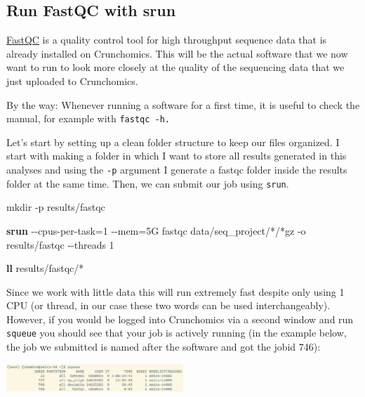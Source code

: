 \documentclass[
  letterpaper,
  DIV=11,
  numbers=noendperiod]{scrreprt}
\newenvironment{Shaded}{}{}
\newcommand{\AttributeTok}[1]{\textcolor[rgb]{0.84,0.23,0.29}{#1}}
\newcommand{\ExtensionTok}[1]{\textcolor[rgb]{0.84,0.23,0.29}{\textbf{#1}}}
\newcommand{\FunctionTok}[1]{\textcolor[rgb]{0.44,0.26,0.76}{#1}}
\newcommand{\NormalTok}[1]{\textcolor[rgb]{0.14,0.16,0.18}{#1}}
\newcommand{\OperatorTok}[1]{\textcolor[rgb]{0.14,0.16,0.18}{#1}}
\newcommand{\PreprocessorTok}[1]{\textcolor[rgb]{0.84,0.23,0.29}{#1}}
\begin{document}
\subsection{Run FastQC with srun}\label{run-fastqc-with-srun}

\href{https://www.bioinformatics.babraham.ac.uk/projects/fastqc/}{FastQC}
is a quality control tool for high throughput sequence data that is
already installed on Crunchomics. This will be the actual software that
we now want to run to look more closely at the quality of the sequencing
data that we just uploaded to Crunchomics.

By the way: Whenever running a software for a first time, it is useful
to check the manual, for example with \texttt{fastqc\ -h.}

Let's start by setting up a clean folder structure to keep our files
organized. I start with making a folder in which I want to store all
results generated in this analyses and using the \texttt{-p} argument I
generate a fastqc folder inside the results folder at the same time.
Then, we can submit our job using \texttt{srun}.

\begin{Shaded}
\begin{Highlighting}[]
\FunctionTok{mkdir} \AttributeTok{{-}p}\NormalTok{ results/fastqc }

\ExtensionTok{srun} \AttributeTok{{-}{-}cpus{-}per{-}task}\OperatorTok{=}\NormalTok{1 }\AttributeTok{{-}{-}mem}\OperatorTok{=}\NormalTok{5G fastqc data/seq\_project/}\PreprocessorTok{*}\NormalTok{/}\PreprocessorTok{*}\NormalTok{gz }\AttributeTok{{-}o}\NormalTok{ results/fastqc  }\AttributeTok{{-}{-}threads}\NormalTok{ 1}

\ExtensionTok{ll}\NormalTok{ results/fastqc/}\PreprocessorTok{*}
\end{Highlighting}
\end{Shaded}

Since we work with little data this will run extremely fast despite only
using 1 CPU (or thread, in our case these two words can be used
interchangeably). However, if you would be logged into Crunchomics via a
second window and run \texttt{squeue} you should see that your job is
actively running (in the example below, the job we submitted is named
after the software and got the jobid 746):

\begin{center}
\includegraphics[width=0.5\textwidth,height=\textheight]{../img/squeue2.png}
\end{center}
\end{document}
